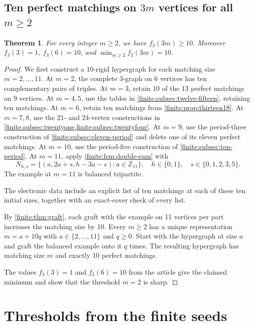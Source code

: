 \documentclass[10pt]{article}
\numberwithin{equation}{section}
\newtheorem{theorem}{Theorem}[section]
\begin{document}
\subsection{Ten perfect matchings on \texorpdfstring{$3m$}{3m} vertices for all \texorpdfstring{$m\ge2$}{m >= 2}}
\begin{theorem}\label{finite:thm:ten-all}
For every integer $m\ge2$, we have $f_3(3m)\ge10$.
Moreover $f_3(3)=1$, $f_3(6)=10$, and
$\min_{m\ge2}f_3(3m)=10$.
\end{theorem}
\begin{proof}
We first construct a $10$-rigid hypergraph for each matching size $m=2,\ldots,11$. At $m=2$, the complete $3$-graph on 6 vertices has ten complementary pairs of triples. At $m=3$, retain 10 of the 13 perfect matchings on 9 vertices. At $m=4,5$, use the tables in \cref{finite:subsec:twelve-fifteen}, retaining ten matchings. At $m=6$, retain ten matchings from \cref{finite:prop:thirteen18}. At $m=7,8$, use the 21- and 24-vertex constructions in \cref{finite:subsec:twentyone,finite:subsec:twentyfour}. At $m=9$, use the period-three construction of \cref{finite:subsec:eleven-period} and delete one of its eleven perfect matchings. At $m=10$, use the period-five construction of \cref{finite:subsec:ten-period}. At $m=11$, apply \cref{finite:lem:double-sum} with
\[
 N_{h,s}=\{(a,2a+s,h-3a-s):a\in\mathbb Z_{11}\},
 \quad h\in\{0,1\},\quad s\in\{0,1,2,3,5\}.
\]
The example at $m=11$ is balanced tripartite.

The electronic data include an explicit list of ten matchings at each of these ten initial sizes, together with an exact-cover check of every list.

By \cref{finite:thm:graft}, each graft with the example on 11 vertices per part increases the matching size by 10. Every $m\ge2$ has a unique representation $m=a+10q$ with $a\in\{2,\ldots,11\}$ and $q\ge0$. Start with the hypergraph at size $a$ and graft the balanced example onto it $q$ times. The resulting hypergraph has matching size $m$ and exactly 10 perfect matchings.

The values $f_3(3)=1$ and $f_3(6)=10$ from the article give the claimed minimum and show that the threshold $m=2$ is sharp.
\end{proof}

\section{Thresholds from the finite seeds}\label{finite:sec:thresholds}
\end{document}
